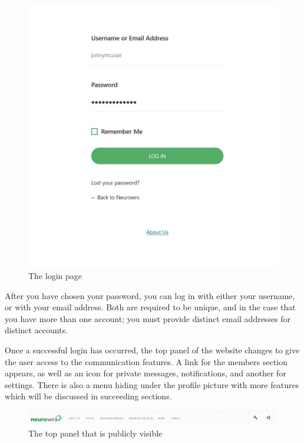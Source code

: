 \documentclass[10pt]{article}
\begin{document}
\begin{figure}[h]
    \centering
    \includegraphics[scale=0.3]{images/loginpage.jpg}
    \caption{The login page}
    \label{loginpage}
\end{figure}

\begin{flushleft}
After you have chosen your password, you can log in with either your username, or with your email address.  Both are required to be unique, and in the case that you have more than one account; you must provide distinct email addresses for distinct accounts. 
\end{flushleft}

\begin{flushleft}
Once a successful login has occurred, the top panel of the website changes to give the user access to the communication features.  A link for the members section appears, as well as an icon for private messages, notifications, and another for settings.  There is also a menu hiding under the profile picture with more features which will be discussed in succeeding sections. 
\end{flushleft}

\begin{figure}[h]
    \centering
    \includegraphics[scale=0.3]{images/topbar.jpg}
    \caption{The top panel that is publicly visible}
    \label{topbar}
\end{figure}
\end{document}
